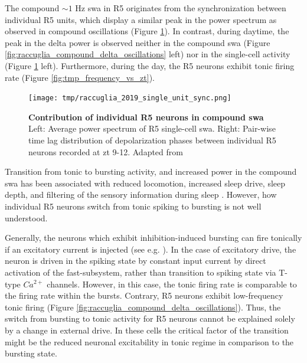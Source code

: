 \documentclass[../main.tex]{subfiles}
\begin{document}
The compound $\sim 1$ Hz \gls{swa} in R5 originates from the synchronization between individual R5 units, which display a similar peak in the power spectrum as observed in compound oscillations \cite{raccugliaNetworkSpecificSynchronizationElectrical2019} (Figure \ref{fig:tmp_single_unit_r5_day_night}).
In contrast, during daytime, the peak in the delta power is observed neither in the compound \gls{swa} (Figure \ref{fig:raccuglia_compound_delta_oscillations} left) nor in the single-cell activity (Figure \ref{fig:tmp_single_unit_r5_day_night} left).
Furthermore, during the day, the R5 neurons exhibit tonic firing rate (Figure \ref{fig:tmp_frequency_vs_zt}).

\begin{figure}[!t]
    \centering
    \texttt{[image: tmp/raccuglia\_2019\_single\_unit\_sync.png]}
    \caption[Contribution of individual R5 neurons in compound \gls{swa}]{
        \textbf{Contribution of individual R5 neurons in compound \gls{swa}}
        Left: Average power spectrum of R5 single-cell \gls{swa}.
        Right: Pair-wise time lag distribution of depolarization phases between individual R5 neurons recorded at \gls{zt} 9-12.
        Adapted from \cite{raccugliaNetworkSpecificSynchronizationElectrical2019}
    }
    \label{fig:tmp_single_unit_r5_day_night}
\end{figure}

Transition from tonic to bursting activity, and increased power in the compound \gls{swa} has been associated with reduced locomotion, increased sleep drive, sleep depth, and filtering of the sensory information during sleep
\cite{liuSleepDriveEncoded2016,raccugliaNetworkSpecificSynchronizationElectrical2019,
raccugliaCoherentMultilevelNetwork2022,suarez-grimaltNeuralArchitectureSleep2021}.
However, how individual R5 neurons switch from tonic spiking to bursting is not well understood.

Generally, the neurons which exhibit inhibition-induced bursting can fire tonically if an excitatory current is injected (see e.g. \cite{wangMultipleDynamicalModes1994}).
In the case of excitatory drive, the neuron is driven in the spiking state by constant input current by direct activation of the fast-subsystem, rather than transition to spiking state via T-type $Ca^{2+}$ channels. However, in this case, the tonic firing rate is comparable to the firing rate within the bursts. Contrary, R5 neurons exhibit low-frequency tonic firing \cite{raccugliaNetworkSpecificSynchronizationElectrical2019} (Figure \ref{fig:raccuglia_compound_delta_oscillations}).
Thus, the switch from bursting to tonic activity for R5 neurons cannot be explained solely by a change in external drive. In these cells the critical factor of the transition might be the reduced neuronal excitability in tonic regime in comparison to the bursting state.
\end{document}
